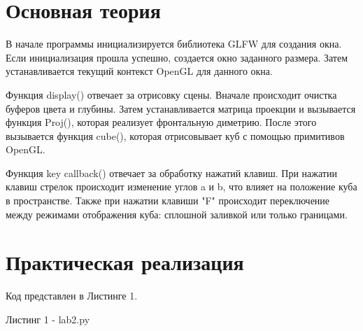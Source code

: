 \documentclass[a4paper, 14pt]{extarticle}
\begin{document}
\section{Основная теория}
\par
В начале программы инициализируется библиотека GLFW для создания окна. Если инициализация прошла успешно, создается окно заданного размера. Затем устанавливается текущий контекст OpenGL для данного окна.
\par
Функция display() отвечает за отрисовку сцены. Вначале происходит очистка буферов цвета и глубины. Затем устанавливается матрица проекции и вызывается функция Proj(), которая реализует фронтальную диметрию. После этого вызывается функция cube(), которая отрисовывает куб с помощью примитивов OpenGL.
\par
Функция key callback() отвечает за обработку нажатий клавиш. При нажатии клавиш стрелок происходит изменение углов a и b, что влияет на положение куба в пространстве. Также при нажатии клавиши "F" происходит переключение между режимами отображения куба: сплошной заливкой или только границами.

\pagebreak
\section{Практическая реализация}
Код представлен в Листинге 1.
\par
\begin{center}
    Листинг 1 - lab2.py
\end{center}
\end{document}
